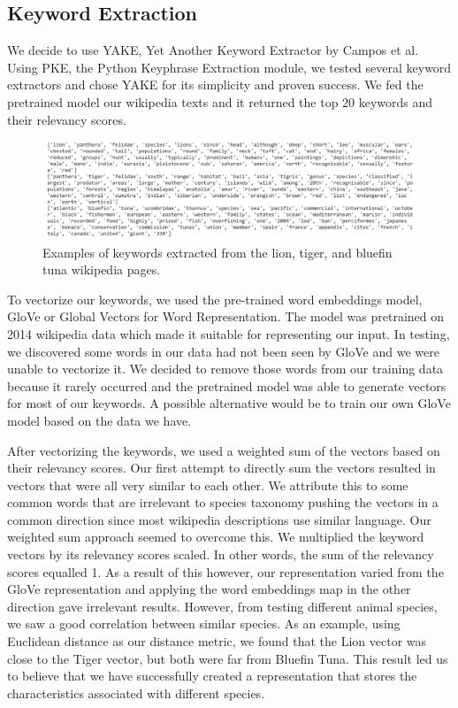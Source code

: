 \documentclass[10pt,twocolumn,letterpaper]{article}
\begin{document}
\subsection{Keyword Extraction}
We decide to use YAKE, Yet Another Keyword Extractor by Campos et al. Using PKE, the Python Keyphrase Extraction module, we tested several keyword extractors and chose YAKE for its simplicity and proven success. We fed the pretrained model our wikipedia texts and it returned the top 20 keywords and their relevancy scores. 
\begin{figure}
  \includegraphics[width=\linewidth]{keywords_example.png}
  \caption{Examples of keywords extracted from the lion, tiger, and bluefin tuna wikipedia pages.}
  \label{fig:keywords_example}
\end{figure}

To vectorize our keywords, we used the pre-trained word embeddings model, GloVe or Global Vectors for Word Representation. The model was pretrained on 2014 wikipedia data which made it suitable for representing our input. In testing, we discovered some words in our data had not been seen by GloVe and we were unable to vectorize it. We decided to remove those words from our training data because it rarely occurred and the pretrained model was able to generate vectors for most of our keywords. A possible alternative would be to train our own GloVe model based on the data we have. 

After vectorizing the keywords, we used a weighted sum of the vectors based on their relevancy scores. Our first attempt to directly sum the vectors resulted in vectors that were all very similar to each other. We attribute this to some common words that are irrelevant to species taxonomy pushing the vectors in a common direction since most wikipedia descriptions use similar language. Our weighted sum approach seemed to overcome this. We multiplied the keyword vectors by its relevancy scores scaled. In other words, the sum of the relevancy scores equalled 1. As a result of this however, our representation varied from the GloVe representation and applying the word embeddings map in the other direction gave irrelevant results. However, from testing different animal species, we saw a good correlation between similar species. As an example, using Euclidean distance as our distance metric, we found that the Lion vector was close to the Tiger vector, but both were far from Bluefin Tuna. This result led us to believe that we have successfully created a representation that stores the characteristics associated with different species. 
\end{document}
